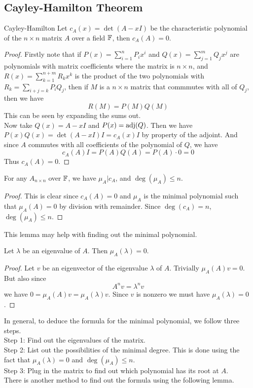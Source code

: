 \documentclass[a4paper]{article}
\begin{document}
\subsection{Cayley-Hamilton Theorem}
\begin{thm}{Cayley-Hamilton}{} Let $c_A(x)=\det(A-xI)$ be the characteristic polynomial of the $n\times n$ matrix $A$ over a field $\mathbb{F}$, then $c_A(A)=0$. 
\begin{proof} Firstly note that if $P(x)=\sum_{i=1}^nP_ix^i$ and $Q(x)=\sum_{j=1}^mQ_jx^j$ are polynomials with matrix coefficients where the matrix is $n\times n$, and $R(x)=\sum_{k=1}^{n+m}R_kx^k$ is the product of the two polynomials with $R_k=\sum_{i+j=k}P_iQ_j$, then if $M$ is a $n\times n$ matrix that commmutes with all of $Q_j$, then we have $$R(M)=P(M)Q(M)$$
This can be seen by expanding the sums out. \\
Now take $Q(x)=A-xI$ and $P(x)=\operatorname{adj}(Q)$. Then we have $P(x)Q(x)=\det(A-xI)I=c_A(x)I$ by property of the adjoint. And since $A$ commutes with all coefficients of the polynomial of $Q$, we have $$c_A(A)I=P(A)Q(A)=P(A)\cdot 0=0$$ Thus $c_A(A)=0$. 
\end{proof}
\end{thm}

\begin{crl}{}{} For any $A_{n\times n}$ over $\mathbb{F}$, we have $\mu_A|c_A$, and $\deg(\mu_A)\leq n$. 
\begin{proof}
This is clear since $c_A(A)=0$ and $\mu_A$ is the minimal polynomial such that $\mu_A(A)=0$ by division with remainder. Since $\deg(c_A)=n$, $\deg(\mu_A)\leq n$. 
\end{proof}
\end{crl}

This lemma may help with finding out the minimal polynomial. 

\begin{lmm}{}{} Let $\lambda$ be an eigenvalue of $A$. Then $\mu_A(\lambda)=0$. 
\begin{proof}
Let $v$ be an eigenvector of the eigenvalue $\lambda$ of $A$. Trivially $\mu_A(A)v=0$. But also since $$A^nv=\lambda^nv$$ we have $0=\mu_A(A)v=\mu_A(\lambda)v$. Since $v$ is nonzero we must have $\mu_A(\lambda)=0$. 
\end{proof}
\end{lmm}

In general, to deduce the formula for the minimal polynomial, we follow three steps. \\
Step 1: Find out the eigenvalues of the matrix. \\
Step 2: List out the possibilities of the minimal degree. This is done using the fact that $\mu_A(\lambda)=0$ and $\deg(\mu_A)\leq n$. \\
Step 3: Plug in the matrix to find out which polynomial has its root at $A$. \\
There is another method to find out the formula using the following lemma. 
\end{document}
